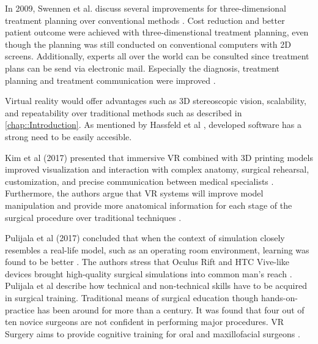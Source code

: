 In 2009, Swennen et al. discuss several improvements for three-dimensional treatment planning over conventional methods \cite{swennen2009three}.
Cost reduction and better patient outcome were achieved with three-dimenstional treatment planning, even though the planning was still conducted on conventional computers with 2D screens.
Additionally, experts all over the world can be consulted since treatment plans can be send via electronic mail.
Especially the diagnosis, treatment planning and treatment communication were improved \cite{swennen2009three}.

Virtual reality would offer advantages such as 3D stereoscopic vision, scalability, and repeatability over traditional methods such as described in \ref{chap::Introduction}.
As mentioned by Hassfeld et al \cite{HASSFELD20012}, developed software has a strong need to be easily accesible.

Kim et al (2017) presented that immersive VR combined with 3D printing models improved visualization and interaction with complex anatomy, surgical rehearsal, customization, and precise communication between medical specialists \cite{.2017}.
Furthermore, the authors argue that VR systems will improve model manipulation and provide more anatomical information for each stage of the surgical procedure over traditional techniques \cite{.2017}.

Pulijala et al (2017) concluded that when the context of simulation closely resembles a real-life model, such as an operating room environment, learning was found to be better \cite{Pulijala.2017}.
The authors stress that Oculus Rift and HTC Vive-like devices brought high-quality surgical simulations into common man’s reach \cite{Pulijala.2017}.
\newline
Pulijala et al describe how technical and non-technical skills have to be acquired in surgical training.
Traditional means of surgical education though hands-on-practice has been around for more than a century.
It was found that four out of ten novice surgeons are not confident in performing major procedures.
VR Surgery aims to provide cognitive training for oral and maxillofacial surgeons \cite{RN68}.

